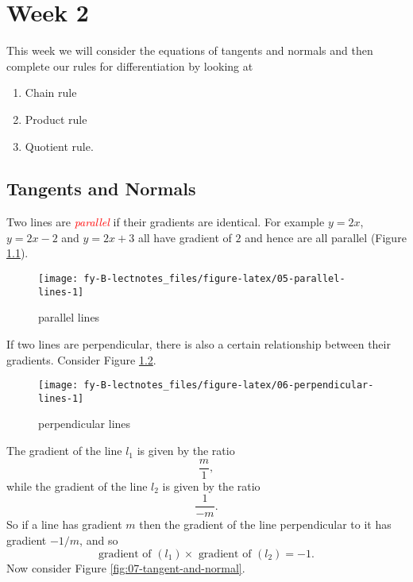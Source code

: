 \documentclass[
  11pt,
  oneside]{book}
\providecommand{\tightlist}{%
  \setlength{\itemsep}{0pt}\setlength{\parskip}{0pt}}
\newcommand{\slide}{}
\theoremstyle{definition}
\theoremstyle{definition}
\theoremstyle{definition}
\theoremstyle{definition}
\theoremstyle{remark}
\begin{document}
\chapter{Week 2}\label{week-two}

This week we will consider the equations of tangents and normals and then complete our rules for differentiation by looking at

\begin{enumerate}
\def\labelenumi{\arabic{enumi}.}
\tightlist
\item
  Chain rule
\item
  Product rule
\item
  Quotient rule.
\end{enumerate}

\slide

\section{Tangents and Normals}\label{lecture-four}

Two lines are \textcolor{red}{\em parallel} if their gradients are identical. For example \(y=2x\), \(y=2x-2\) and \(y=2x+3\) all have gradient of \(2\) and hence are all parallel (Figure \ref{fig:05-parallel-lines}).

\begin{figure}

{\centering \texttt{[image: fy-B-lectnotes\_files/figure-latex/05-parallel-lines-1]} 

}

\caption{parallel lines}\label{fig:05-parallel-lines}
\end{figure}
\slide

If two lines are perpendicular, there is also a certain relationship between their gradients. Consider Figure \ref{fig:06-perpendicular-lines}.

\begin{figure}

{\centering \texttt{[image: fy-B-lectnotes\_files/figure-latex/06-perpendicular-lines-1]} 

}

\caption{perpendicular lines}\label{fig:06-perpendicular-lines}
\end{figure}

The gradient of the line \(l_1\) is given by the ratio
\[
\frac{m}{1},
\]
while the gradient of the line \(l_2\) is given by the ratio
\[
\frac{1}{-m}.
\]
So if a line has gradient \(m\) then the gradient of the line perpendicular to it has gradient \(-1/m\), and so
\[
\text{gradient of }(l_1) \times \text{ gradient of }(l_2) = -1.
\]
Now consider Figure \ref{fig:07-tangent-and-normal}.
\end{document}
